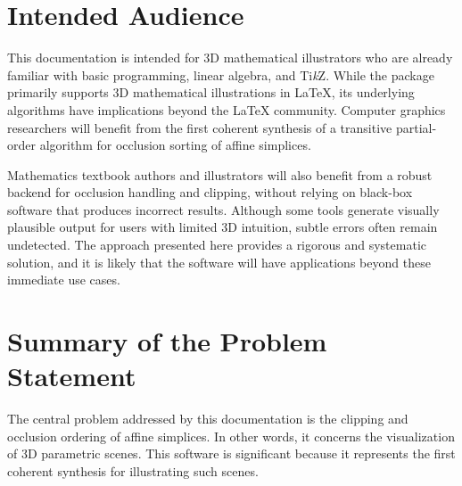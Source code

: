 
\section{Intended Audience}

This documentation is intended for \(3\)D mathematical illustrators
who are already familiar with basic programming, linear algebra,
and Ti\textit{k}Z. While the package primarily supports \(3\)D
mathematical illustrations in \LaTeX{}, its underlying algorithms
have implications beyond the \LaTeX{} community. Computer graphics
researchers will benefit from the first coherent synthesis of a
transitive partial-order algorithm for occlusion sorting of affine
simplices.

Mathematics textbook authors and illustrators will also benefit
from a robust backend for occlusion handling and clipping, without
relying on black-box software that produces incorrect results.
Although some tools generate visually plausible output for users
with limited 3D intuition, subtle errors often remain undetected.
The approach presented here provides a rigorous and systematic
solution, and it is likely that the software will have applications
beyond these immediate use cases.

\section{Summary of the Problem Statement}

The central problem addressed by this documentation is the
clipping and occlusion ordering of affine simplices. In other
words, it concerns the visualization of \(3\)D parametric scenes.
This software is significant because it represents the first
coherent synthesis for illustrating such scenes.
